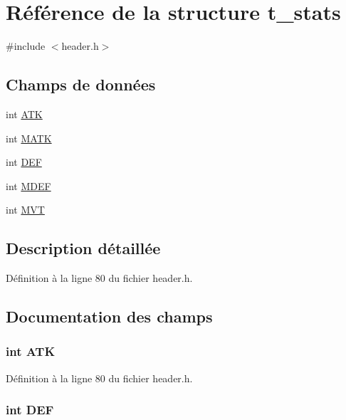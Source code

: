 \hypertarget{structt__stats}{\section{Référence de la structure t\+\_\+stats}
\label{structt__stats}
}


{\ttfamily \#include $<$header.\+h$>$}

\subsection*{Champs de données}
\begin{DoxyCompactItemize}
\item 
int \hyperlink{structt__stats_a3b3918526788ae6b163c41dc25326396}{A\+T\+K}
\item 
int \hyperlink{structt__stats_ae183b98dc9aca9905f531bfd4dd51a1c}{M\+A\+T\+K}
\item 
int \hyperlink{structt__stats_a30707041436614e9e3759b7bf533b201}{D\+E\+F}
\item 
int \hyperlink{structt__stats_a92ab6d75a95ed209b7875314f53fb555}{M\+D\+E\+F}
\item 
int \hyperlink{structt__stats_a397f7940443939415a50f324dc5f56f9}{M\+V\+T}
\end{DoxyCompactItemize}


\subsection{Description détaillée}


Définition à la ligne 80 du fichier header.\+h.



\subsection{Documentation des champs}
\hypertarget{structt__stats_a3b3918526788ae6b163c41dc25326396}{
\subsubsection[{A\+T\+K}]{\setlength{\rightskip}{0pt plus 5cm}int A\+T\+K}}\label{structt__stats_a3b3918526788ae6b163c41dc25326396}


Définition à la ligne 80 du fichier header.\+h.

\hypertarget{structt__stats_a30707041436614e9e3759b7bf533b201}{
\subsubsection[{D\+E\+F}]{\setlength{\rightskip}{0pt plus 5cm}int D\+E\+F}}\label{structt__stats_a30707041436614e9e3759b7bf533b201}


